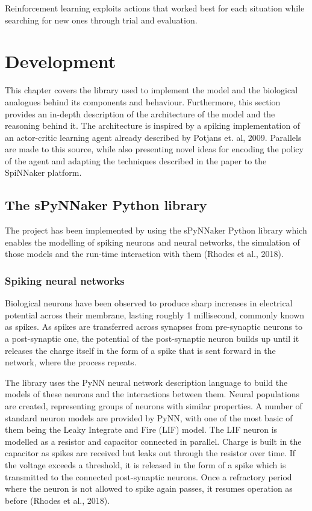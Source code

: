\documentclass[10pt]{article}
\begin{document}
    Reinforcement learning exploits actions that worked best for each situation while searching for new ones through trial and evaluation.
    
    \section{Development}

    This chapter covers the library used to implement the model and the biological analogues behind its components and behaviour. Furthermore, this section provides an in-depth description of the architecture of the model and the reasoning behind it. The architecture is inspired by a spiking implementation of an actor-critic learning agent already described by Potjans et. al, 2009. Parallels are made to this source, while also presenting novel ideas for encoding the policy of the agent and adapting the techniques described in the paper to the SpiNNaker platform.

    \subsection{The sPyNNaker Python library}

    The project has been implemented by using the sPyNNaker Python library which enables the modelling of spiking neurons and neural networks, the simulation of those models and the run-time interaction with them (Rhodes et al., 2018).

    \subsubsection{Spiking neural networks}

    Biological neurons have been observed to produce sharp increases in electrical potential across their membrane, lasting roughly 1 millisecond, commonly known as spikes. As spikes are transferred across synapses from pre-synaptic neurons to a post-synaptic one, the potential of the post-synaptic neuron builds up until it releases the charge itself in the form of a spike that is sent forward in the network, where the process repeats.

    The library uses the PyNN neural network description language to build the models of these neurons and the interactions between them. Neural populations are created, representing groups of neurons with similar properties. A number of standard neuron models are provided by PyNN, with one of the most basic of them being the Leaky Integrate and Fire (LIF) model. The LIF neuron is modelled as a resistor and capacitor connected in parallel. Charge is built in the capacitor as spikes are received but leaks out through the resistor over time. If the voltage exceeds a threshold, it is released in the form of a spike which is transmitted to the connected post-synaptic neurons. Once a refractory period where the neuron is not allowed to spike again passes, it resumes operation as before (Rhodes et al., 2018).
    
\end{document}
